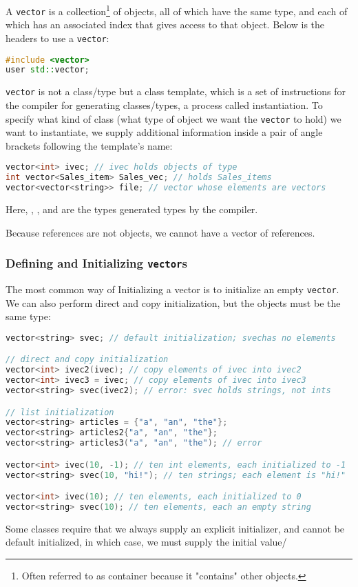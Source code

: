 A \texttt{vector} is a collection\footnote{Often referred to as container because it "contains" other objects.} of objects, all of which have the same type, and each of which has an associated index that gives access to that object. Below is the headers to use a \texttt{vector}:
\begin{lstlisting}[language=C++]
#include <vector>
user std::vector;
\end{lstlisting}

\texttt{vector} is not a class/type but a class template, which is a set of instructions for the compiler for generating classes/types, a process called instantiation. To specify what kind of class (what type of object we want the \texttt{vector} to hold) we want to instantiate, we supply additional information inside a pair of angle brackets following the template's name:
\begin{lstlisting}[language=C++]
vector<int> ivec; // ivec holds objects of type 
int vector<Sales_item> Sales_vec; // holds Sales_items 
vector<vector<string>> file; // vector whose elements are vectors
\end{lstlisting}
Here, , , and  are the types generated types by the compiler.

Because references are not objects, we cannot have a vector of references. 

\subsubsection{Defining and Initializing \texttt{vector}s}

The most common way of Initializing a vector is to initialize an empty \texttt{vector}. We can also perform direct and copy initialization, but the objects must be the same type:
\begin{lstlisting}[language=C++]
vector<string> svec; // default initialization; svechas no elements

// direct and copy initialization
vector<int> ivec2(ivec); // copy elements of ivec into ivec2 
vector<int> ivec3 = ivec; // copy elements of ivec into ivec3 
vector<string> svec(ivec2); // error: svec holds strings, not ints

// list initialization
vector<string> articles = {"a", "an", "the"};
vector<string> articles2{"a", "an", "the"};
vector<string> articles3("a", "an", "the"); // error

vector<int> ivec(10, -1); // ten int elements, each initialized to -1 
vector<string> svec(10, "hi!"); // ten strings; each element is "hi!"

vector<int> ivec(10); // ten elements, each initialized to 0 
vector<string> svec(10); // ten elements, each an empty string
\end{lstlisting}
Some classes require that we always supply an explicit initializer, and cannot be default initialized, in which case, we must supply the initial value/

